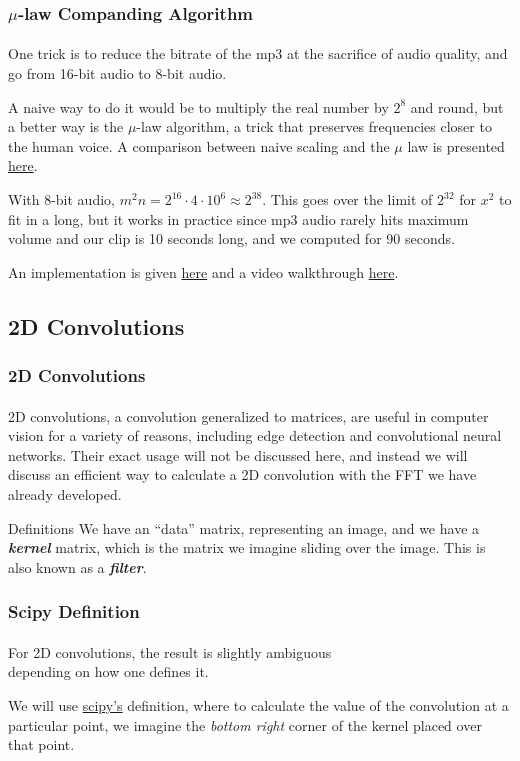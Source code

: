 \documentclass{beamer}                             %
\newcommand{\emphasis}[1]{\textbf{\textit{#1}}}
\begin{document}
\begin{frame}
\frametitle{\( \mu \)-law Companding Algorithm}
\framesubtitle{}
One trick is to reduce the bitrate of the mp3 at the sacrifice of audio quality,
and go from 16-bit audio to 8-bit audio. \pause

A naive way to do it would be to multiply the real number by \( 2^8 \) and
round, but a better way is the \( \mu \)-law algorithm, a trick that preserves
frequencies closer to the human voice. A comparison between naive scaling
and the \( \mu \) law is presented
\href{https://www.youtube.com/watch?v=PqkE_t5cCoA}{here}. \pause

With 8-bit audio, \( m^2 n = 2^{16} \cdot 4 \cdot 10^6 \approx 2^{38} \).
This goes over the limit of \( 2^{32} \) for \( x^2 \) to fit in a long,
but it works in practice since mp3 audio rarely hits maximum volume and
our clip is 10 seconds long, and we computed for 90 seconds. \pause

An implementation is given
\href{https://github.com/stephen-huan/anime-music-quiz}{here} and a video
walkthrough \href{https://www.youtube.com/watch?v=7fUicc_lIGA}{here}.
\end{frame}

\subsection{2D Convolutions}
\begin{frame}
\frametitle{2D Convolutions}
\framesubtitle{}
2D convolutions, a convolution generalized to matrices, are useful in computer
vision for a variety of reasons, including edge detection and convolutional
neural networks. Their exact usage will not be discussed here, and instead
we will discuss an efficient way to calculate a 2D convolution with the FFT we 
have already developed. 

\begin{alertblock}{Definitions}
  We have an \enquote{data} matrix, representing an image,
  and we have a \emphasis{kernel} matrix, which is the matrix we imagine
  sliding over the image. This is also known as a \emphasis{filter}.
\end{alertblock}
\end{frame}

\begin{frame}
\frametitle{Scipy Definition}
\framesubtitle{}
For 2D convolutions, the result is slightly ambiguous \\
depending on how one defines it. 

We will use
\href{https://docs.scipy.org/doc/scipy/reference/generated/scipy.signal.convolve2d.html}{scipy's}
definition, where to calculate the value of the convolution at a particular
point, we imagine the \textit{bottom right} corner of the kernel
placed over that point.
\end{frame}
\end{document}

